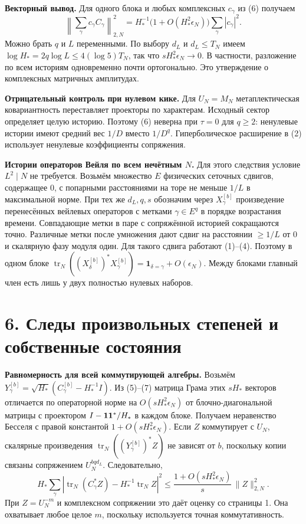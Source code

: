 \documentclass[11pt,a4paper]{article}
\newcommand{\trn}{\operatorname{tr}_N}
\newcommand{\sect}[1]{\section*{\sffamily\color{ink}#1}}
\newcommand{\subt}[1]{\par\medskip\noindent\textbf{#1.}\quad}
\begin{document}
\subt{Векторный вывод}
Для одного блока и любых комплексных \(c_\gamma\) из (6) получаем
\[
  \left\|\sum_\gamma c_\gamma C_\gamma\right\|_{2,N}^2
     =H_*^{-1}\bigl(1+O(H_*^2\epsilon_N)\bigr)
                               \sum_\gamma|c_\gamma|^2 .
\]
Можно брать \(q\) и \(L\) переменными. По выбору \(d_L\) и \(d_L\le T_N\) имеем
\(\log H_*=2q\log L\le4(\log 5) T_N\), так что \(sH_*^2\epsilon_N\to0\).
В частности, разложение по всем историям одновременно почти ортогонально. Это утверждение о комплексных матричных амплитудах.

\subt{Отрицательный контроль при нулевом кике}
Для \(U_N=M_N\) метаплектическая ковариантность переставляет проекторы по характерам. Исходный сектор определяет целую историю. Поэтому (6) неверна при \(\tau=0\) для \(q\ge2\): ненулевые истории имеют средний вес \(1/D\) вместо \(1/D^q\). Гиперболическое расширение в (2) использует ненулевые коэффициенты сопряжения.

\subt{Истории операторов Вейля по всем нечётным \(N\)}
Для этого следствия условие \(L^2\mid N\) не требуется. Возьмём множество \(E\) физических сеточных сдвигов, содержащее 0, с попарными расстояниями на торе не меньше \(1/L\) в максимальной норме. При тех же \(d_L,q,s\) обозначим через \(X_\gamma^{[b]}\) произведение перенесённых вейлевых операторов с метками \(\gamma\in E^q\) в порядке возрастания времени. Совпадающие метки в паре с сопряжённой историей сокращаются точно. Различные метки после умножения дают сдвиг на расстоянии \(\ge1/L\) от 0 и скалярную фазу модуля один. Для такого сдвига работают (1)--(4). Поэтому в одном блоке
\(\trn((X_\delta^{[b]})^*X_\gamma^{[b]})=\mathbf1_{\delta=\gamma}+O(\epsilon_N)\).
Между блоками главный член есть лишь у двух полностью нулевых наборов.

\newpage
\sect{6. Следы произвольных степеней и собственные состояния}
\subt{Равномерность для всей коммутирующей алгебры}
Возьмём \(Y_\gamma^{[b]}=\sqrt{H_*}(C_\gamma^{[b]}-H_*^{-1}I)\).
Из (5)--(7) матрица Грама этих \(sH_*\) векторов отличается по операторной норме на \(O(sH_*^2\epsilon_N)\) от блочно-диагональной матрицы с проектором \(I-{\bf1}{\bf1}^*/H_*\) в каждом блоке. Получаем неравенство Бесселя с правой константой \(1+O(sH_*^2\epsilon_N)\). Если \(Z\) коммутирует с \(U_N\), скалярные произведения \(\trn((Y_\gamma^{[b]})^*Z)\) не зависят от \(b\), поскольку копии связаны сопряжением \(U_N^{b q d_L}\). Следовательно,
\[
 H_*\sum_\gamma
    \left|\trn(C_\gamma^*Z)-H_*^{-1}\trn Z\right|^2
     \le \frac{1+O(sH_*^2\epsilon_N)}{s}\,\|Z\|_{2,N}^2 .        \tag{8}
\]
При \(Z=U_N^{-m}\) и комплексном сопряжении это даёт оценку со страницы 1. Она охватывает любое целое \(m\), поскольку используется точная коммутативность.
\end{document}
